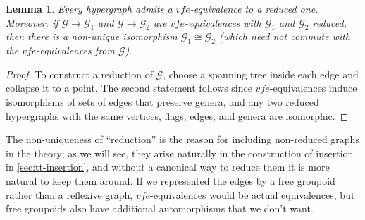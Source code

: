 \documentclass{article}
\newtheorem{lem}[thm]{Lemma}
\theoremstyle{definition}
\newtheorem{defn}[thm]{Definition}
\theoremstyle{remark}
\def\G{\mathcal{G}}
\begin{document}
\begin{lem}\label{thm:reduction}
  Every hypergraph admits a $vfe$-equivalence to a reduced one.
  Moreover, if $\G\to \G_1$ and $\G \to \G_2$ are $vfe$-equivalences with $\G_1$ and $\G_2$ reduced, then there is a non-unique isomorphism $\G_1 \cong \G_2$ (which need not commute with the $vfe$-equivalences from $\G$).
\end{lem}
\begin{proof}
  To construct a reduction of $\G$, choose a spanning tree inside each edge and collapse it to a point.
  The second statement follows since $vfe$-equivalences induce isomorphisms of sets of edges that preserve genera, and any two reduced hypergraphs with the same vertices, flags, edges, and genera are isomorphic.
\end{proof}

The non-uniqueness of ``reduction'' is the reason for including non-reduced graphs in the theory; as we will see, they arise naturally in the construction of insertion in \cref{sec:tt-insertion}, and without a canonical way to reduce them it is more natural to keep them around.
If we represented the edges by a free groupoid rather than a reflexive graph, $vfe$-equivalences would be actual equivalences, but free groupoids also have additional automorphisms that we don't want.


\end{document}
